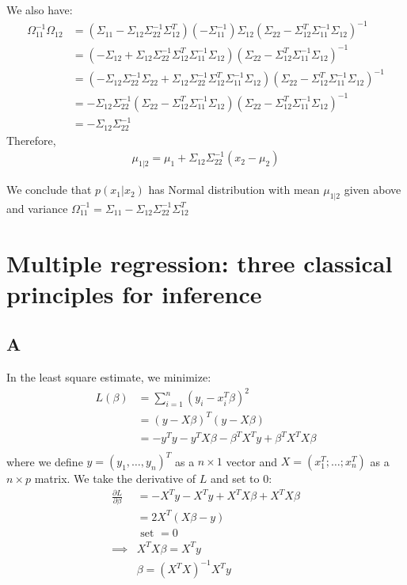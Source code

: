 \documentclass{article}
\begin{document}
We also have:
\begin{align*}
\Omega_{11}^{-1}\Omega_{12} &=  (\Sigma_{11} - \Sigma_{12}\Sigma_{22}^{-1}\Sigma_{12}^T) (-\Sigma_{11}^{-1})\Sigma_{12}(\Sigma_{22} - \Sigma_{12}^T \Sigma_{11}^{-1} \Sigma_{12})^{-1}\\
&= (-\Sigma_{12} + \Sigma_{12}\Sigma_{22}^{-1}\Sigma_{12}^T\Sigma_{11}^{-1}\Sigma_{12})(\Sigma_{22} - \Sigma_{12}^T \Sigma_{11}^{-1} \Sigma_{12})^{-1}\\
&= (-\Sigma_{12}\Sigma_{22}^{-1}\Sigma_{22} + \Sigma_{12}\Sigma_{22}^{-1}\Sigma_{12}^T\Sigma_{11}^{-1}\Sigma_{12})(\Sigma_{22} - \Sigma_{12}^T \Sigma_{11}^{-1} \Sigma_{12})^{-1}\\
&= -\Sigma_{12}\Sigma_{22}^{-1}(\Sigma_{22} - \Sigma_{12}^T\Sigma_{11}^{-1}\Sigma_{12})(\Sigma_{22} - \Sigma_{12}^T \Sigma_{11}^{-1} \Sigma_{12})^{-1}\\
&= -\Sigma_{12}\Sigma_{22}^{-1}
\end{align*}
Therefore,
\begin{align*}
\mu_{1|2} = \mu_1 + \Sigma_{12}\Sigma_{22}^{-1}(x_2-\mu_2)
\end{align*}

We conclude that \(p(x_1|x_2)\) has Normal distribution with mean \(\mu_{1|2}\) given above and variance \(\Omega_{11}^{-1} = \Sigma_{11} - \Sigma_{12}\Sigma_{22}^{-1}\Sigma_{12}^T\)


\section{Multiple regression: three classical principles for inference}

\subsection{A}
In the least square estimate, we minimize:
\begin{align*}
L(\beta) &= \sum_{i=1}^n (y_i - x_i^T\beta)^2\\
&= (y - X\beta)^T(y - X\beta)\\
&= -y^T y -y^TX\beta - \beta^TX^T y + \beta^TX^T X\beta\\
\end{align*}
where we define \(y = (y_1, \ldots, y_n)^T\) as a \(n\times 1\) vector and \(X = (x_1^T; \ldots; x_n^T)\) as a \(n\times p\) matrix.
We take the derivative of \(L\) and set to \(0\):
\begin{align*}
\frac{\partial L}{\partial \beta} &= - X^T y - X^T y + X^T X \beta + X^T X \beta\\
&= 2 X^T (X \beta - y) \\
& \text{  set } = 0 \\
\implies & X^TX\beta = X^Ty\\
&\beta = (X^TX)^{-1}X^Ty
\end{align*}
\end{document}
